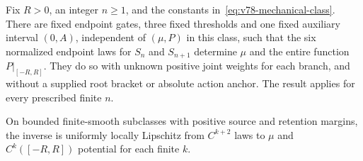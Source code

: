 \begin{theorem}
\label{thm:v78-mechanical-main}
Fix $R>0$, an integer $n\ge1$, and the constants
in~\eqref{eq:v78-mechanical-class}.  There are fixed endpoint gates,
three fixed thresholds and one fixed auxiliary interval $(0,A)$,
independent of $(\mu,P)$ in this class, such that the six normalized
endpoint laws for $S_n$ and $S_{n+1}$ determine $\mu$ and the entire
function $P|_{[-R,R]}$.  They do so with unknown positive joint weights
for each branch, and without a supplied root bracket or absolute action
anchor.  The result applies for every prescribed finite $n$.

On bounded finite-smooth subclasses with positive source and retention
margins, the inverse is uniformly locally Lipschitz from $C^{k+2}$ laws
to $\mu$ and $C^k([-R,R])$ potential for each finite $k$.
\end{theorem}
